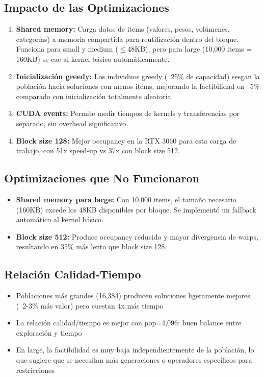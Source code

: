 \documentclass[12pt,a4paper]{article}
\begin{document}
\subsection{Impacto de las Optimizaciones}

\begin{enumerate}
  \item \textbf{Shared memory:} Carga datos de items (valores, pesos, vol\'umenes, categor\'ias) a memoria compartida para reutilizaci\'on dentro del bloque. Funciona para small y medium ($\leq$48KB), pero para large (10,000 items = 160KB) se cae al kernel b\'asico autom\'aticamente.
  \item \textbf{Inicializaci\'on greedy:} Los individuos greedy (~25\% de capacidad) sesgan la poblaci\'on hacia soluciones con menos items, mejorando la factibilidad en ~5\% comparado con inicializaci\'on totalmente aleatoria.
  \item \textbf{CUDA events:} Permite medir tiempos de kernels y transferencias por separado, sin overhead significativo.
  \item \textbf{Block size 128:} Mejor occupancy en la RTX 3060 para esta carga de trabajo, con 51x speed-up vs 37x con block size 512.
\end{enumerate}

\subsection{Optimizaciones que No Funcionaron}

\begin{itemize}
  \item \textbf{Shared memory para large:} Con 10,000 items, el tama\~no necesario (160KB) excede los 48KB disponibles por bloque. Se implement\'o un fallback autom\'atico al kernel b\'asico.
  \item \textbf{Block size 512:} Produce occupancy reducido y mayor divergencia de warps, resultando en 35\% m\'as lento que block size 128.
\end{itemize}

\subsection{Relaci\'on Calidad-Tiempo}

\begin{itemize}
  \item Poblaciones m\'as grandes (16,384) producen soluciones ligeramente mejores (~2-3\% m\'as valor) pero cuestan 4x m\'as tiempo
  \item La relaci\'on calidad/tiempo es mejor con pop=4,096: buen balance entre exploraci\'on y tiempo
  \item En large, la factibilidad es muy baja independientemente de la poblaci\'on, lo que sugiere que se necesitan m\'as generaciones o operadores espec\'ificos para restricciones
\end{itemize}
\end{document}
